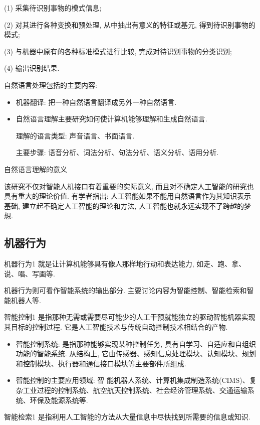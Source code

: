 \indent
      (1) 采集待识别事物的模式信息;

      (2) 对其进行各种变换和预处理, 从中抽出有意义的特征或基元, 得到待识别事物的模式;

      (3) 与机器中原有的各种标准模式进行比较, 完成对待识别事物的分类识别;

      (4) 输出识别结果.

自然语言处理包括的主要内容:
\begin{itemize}
\item 机器翻译: 把一种自然语言翻译成另外一种自然语言.
\item 自然语言理解主要研究如何使计算机能够理解和生成自然语言.

    理解的语言类型: 声音语言、书面语言.

    主要步骤: 语音分析、词法分析、句法分析、语义分析、语用分析.
\end{itemize}

自然语言理解的意义

该研究不仅对智能人机接口有着重要的实际意义, 而且对不确定人工智能的研究也具有重大的理论价值. 有学者指出: 人工智能如果不能用自然语言作为其知识表示基础, 建立起不确定人工智能的理论和方法, 人工智能也就永远实现不了跨越的梦想.
\subsection{机器行为}
\vspace{0.5cm}
\begin{mydef}{机器行为}{1}
就是让计算机能够具有像人那样地行动和表达能力, 如走、跑、拿、说、唱、写画等.
\end{mydef}
机器行为则可看作智能系统的输出部分. 主要讨论内容为智能控制、智能检索和智能机器人等.
\vspace{0.5cm}
\begin{mydef}{智能控制}{1}
是指那种无需或需要尽可能少的人工干预就能独立的驱动智能机器实现其目标的控制过程. 它是人工智能技术与传统自动控制技术相结合的产物.
\end{mydef}
\begin{itemize}
\item 智能控制系统: 是指那种能够实现某种控制任务, 具有自学习、自适应和自组织功能的智能系统. 从结构上, 它由传感器、感知信息处理模块、认知模块、规划和控制模块、执行器和通信接口模块等主要部件所组成.
\item 智能控制的主要应用领域: 智 能机器人系统、计算机集成制造系统(CIMS)、复杂工业过程的控制系统、航空航天控制系统、社会经济管理系统、交通运输系统、环保及能源系统等.
\end{itemize}
\begin{mydef}{智能检索}{1}
是指利用人工智能的方法从大量信息中尽快找到所需要的信息或知识.
\end{mydef}

